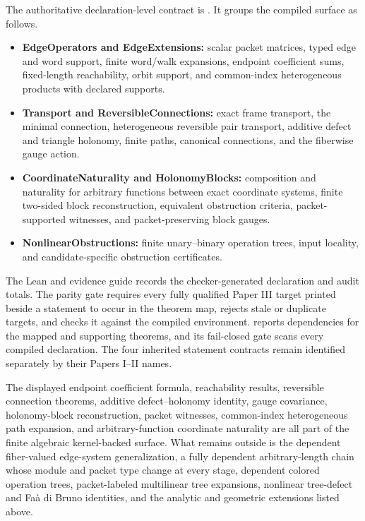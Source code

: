 The authoritative declaration-level contract is
.  It groups the compiled
surface as follows.
\begin{itemize}
\item \textbf{EdgeOperators and EdgeExtensions:} scalar packet matrices,
typed edge and word support, finite word/walk expansions, endpoint coefficient
sums, fixed-length reachability, orbit support, and common-index
heterogeneous products with declared supports.
\item \textbf{Transport and ReversibleConnections:} exact frame transport,
the minimal connection, heterogeneous reversible pair transport, additive
defect and triangle holonomy, finite paths, canonical connections, and the
fiberwise gauge action.
\item \textbf{CoordinateNaturality and HolonomyBlocks:} composition and
naturality for arbitrary functions between exact coordinate systems, finite
two-sided block reconstruction, equivalent obstruction criteria,
packet-supported witnesses, and packet-preserving block gauges.
\item \textbf{NonlinearObstructions:} finite unary--binary operation trees,
input locality, and candidate-specific obstruction certificates.
\end{itemize}
The Lean and evidence guide records the checker-generated declaration
and audit totals.  The parity gate requires every fully qualified Paper III
target printed beside a statement to occur in the theorem map, rejects stale
or duplicate targets, and checks it against the compiled environment.
 reports dependencies for the mapped and supporting
theorems, and its fail-closed gate scans every compiled
 declaration.  The four inherited statement
contracts remain identified separately by their Papers I--II names.

\begin{boundary}
The displayed endpoint coefficient formula, reachability results, reversible
connection theorems, additive defect--holonomy identity, gauge covariance,
holonomy-block reconstruction, packet witnesses, common-index heterogeneous
path expansion, and arbitrary-function coordinate naturality are all part of
the finite algebraic kernel-backed surface.  What remains outside is the
dependent fiber-valued edge-system generalization, a fully dependent
arbitrary-length chain whose module and packet type change at every stage,
dependent colored operation trees, packet-labeled multilinear tree
expansions, nonlinear tree-defect and Fa\`a di Bruno identities, and the
analytic and geometric extensions listed above.
\end{boundary}

